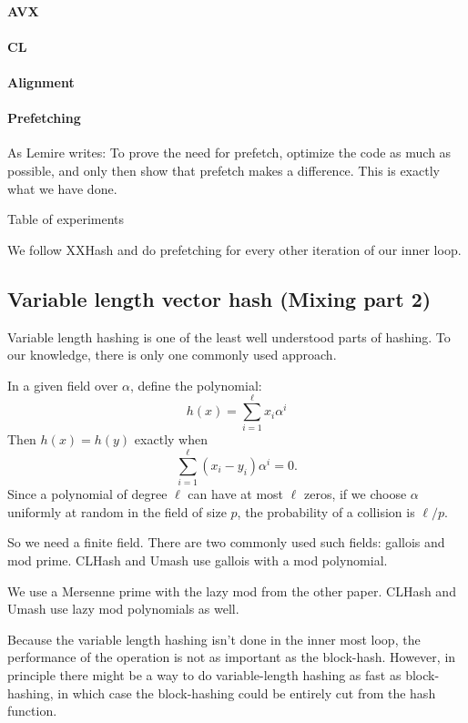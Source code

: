 \paragraph{AVX}
\paragraph{CL}
\paragraph{Alignment}


\paragraph{Prefetching}

As Lemire writes:
To prove the need for prefetch, optimize the code as much as possible, and only then show that prefetch makes a difference.
This is exactly what we have done.

Table of experiments

We follow XXHash and do prefetching for every other iteration of our inner loop.

\subsection{Variable length vector hash (Mixing part 2)}

Variable length hashing is one of the least well understood parts of hashing.
To our knowledge, there is only one commonly used approach.

In a given field over $\alpha$, define the polynomial:
\[h(x) = \sum_{i=1}^\ell x_i \alpha^i\]
Then $h(x)=h(y)$ exactly when
\[\sum_{i=1}^\ell (x_i-y_i) \alpha^i = 0.\]
Since a polynomial of degree $\ell$ can have at most $\ell$ zeros,
if we choose $\alpha$ uniformly at random in the field of size $p$,
the probability of a collision is $\ell/p$.

So we need a finite field.
There are two commonly used such fields: gallois and mod prime.
CLHash and Umash use gallois with a mod polynomial.

We use a Mersenne prime
with the lazy mod from the other paper.
CLHash and Umash use lazy mod polynomials as well.

Because the variable length hashing isn't done in the inner most loop,
the performance of the operation is not as important as the block-hash.
However, in principle there might be a way to do variable-length hashing as fast as block-hashing, in which case the block-hashing could be entirely cut from the hash function.


